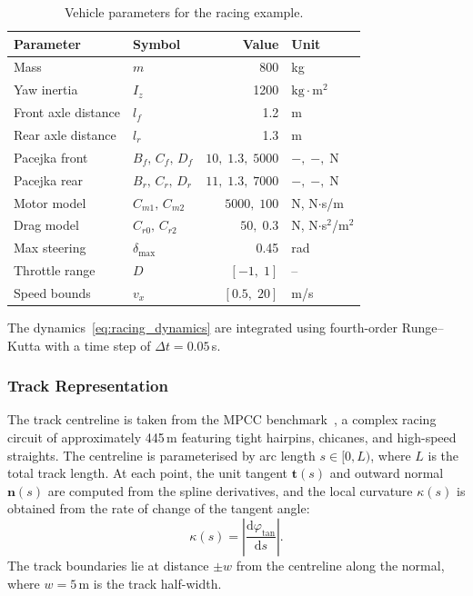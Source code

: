 \begin{table}[ht]
	\centering
	\caption{Vehicle parameters for the racing example.}
	\label{tab:racing_params}
	\begin{tabular}{llrl}
		\toprule
		\textbf{Parameter} & \textbf{Symbol} & \textbf{Value} & \textbf{Unit} \\
		\midrule
		Mass & $m$ & 800 & kg \\
		Yaw inertia & $I_z$ & 1200 & $\text{kg}\cdot\text{m}^2$ \\
		Front axle distance & $l_f$ & 1.2 & m \\
		Rear axle distance & $l_r$ & 1.3 & m \\
		Pacejka front & $B_f,\, C_f,\, D_f$ & $10,\; 1.3,\; 5000$ & $-,\; -,\; \text{N}$ \\
		Pacejka rear & $B_r,\, C_r,\, D_r$ & $11,\; 1.3,\; 7000$ & $-,\; -,\; \text{N}$ \\
		Motor model & $C_{m1},\, C_{m2}$ & $5000,\; 100$ & N, N$\cdot$s/m \\
		Drag model & $C_{r0},\, C_{r2}$ & $50,\; 0.3$ & N, N$\cdot$s$^2$/m$^2$ \\
		Max steering & $\delta_{\max}$ & 0.45 & rad \\
		Throttle range & $D$ & $[-1,\; 1]$ & -- \\
		Speed bounds & $v_x$ & $[0.5,\; 20]$ & m/s \\
		\bottomrule
	\end{tabular}
\end{table}

The dynamics~\eqref{eq:racing_dynamics} are integrated using fourth-order Runge--Kutta with a time step of $\Delta t = 0.05$\,s.


\subsubsection{Track Representation}

The track centreline is taken from the MPCC benchmark~\cite{liniger2015optimization}, a complex racing circuit of approximately 445\,m featuring tight hairpins, chicanes, and high-speed straights. The centreline is parameterised by arc length $s \in [0, L)$, where $L$ is the total track length. At each point, the unit tangent $\mathbf{t}(s)$ and outward normal $\mathbf{n}(s)$ are computed from the spline derivatives, and the local curvature $\kappa(s)$ is obtained from the rate of change of the tangent angle:
\begin{equation*}
	\kappa(s) = \left|\frac{\mathrm{d}\varphi_{\mathrm{tan}}}{\mathrm{d}s}\right|.
\end{equation*}
The track boundaries lie at distance $\pm w$ from the centreline along the normal, where $w = 5$\,m is the track half-width.


